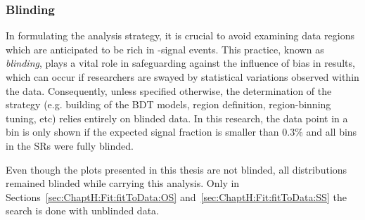 \subsubsection{Blinding}
\label{sec:ChaptH:Fit:strategy:blinding}
In formulating the analysis strategy, it is crucial to avoid examining data regions 
which are anticipated to be rich in \tHq-signal events. This practice, known as 
\textit{blinding}, plays a vital role in safeguarding against the influence of bias in 
results, which can occur if researchers are swayed by statistical variations observed 
within the data. Consequently, unless specified otherwise, the determination of the 
strategy  (e.g. building of the BDT models, region definition, region-binning tuning, etc) 
relies entirely on blinded data.
In this research, the data point in a bin is only shown if the expected signal fraction is smaller than 0.3\% and all bins in
the SRs were fully blinded. %

Even though the plots presented in this thesis are not blinded, all distributions remained 
blinded while carrying this analysis. Only in Sections~\ref{sec:ChaptH:Fit:fitToData:OS} and~\ref{sec:ChaptH:Fit:fitToData:SS}
 the search is done with unblinded data.




